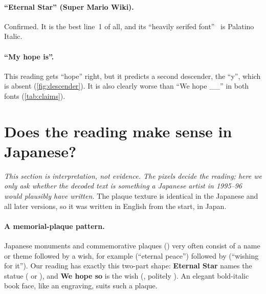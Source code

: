 \documentclass[10pt,a4paper]{article}
\newcommand{\q}[1]{``#1''}
\begin{document}
\paragraph{\q{Eternal Star} (Super Mario Wiki).}
Confirmed. It is the best line~1 of all, and its \q{heavily serifed font}~\cite{smwcourtyard} is Palatino Italic.

\paragraph{\q{My hope is}.}
This reading gets \q{hope} right, but it predicts a second descender, the \q{y}, which is absent (\cref{fig:descender}).
It is also clearly worse than \q{We hope \_\_} in both fonts (\cref{tab:claims}).

\section{Does the reading make sense in Japanese?}
\label{sec:japanese}
\emph{This section is interpretation, not evidence. The pixels decide the reading; here we only ask whether the
decoded text is something a Japanese artist in 1995--96 would plausibly have written.} The plaque texture is
identical in the Japanese and all later versions, so it was written in English from the start, in Japan.

\paragraph{A memorial-plaque pattern.}
Japanese monuments and commemorative plaques () very often consist of a name or theme followed by a wish,
for example  (\q{eternal peace}) followed by  (\q{wishing for it}). Our reading has
exactly this two-part shape: \textbf{Eternal Star} names the statue ( or ), and
\textbf{We hope so} is the wish (, politely ). An elegant bold-italic book
face, like an engraving, suits such a plaque.
\end{document}
